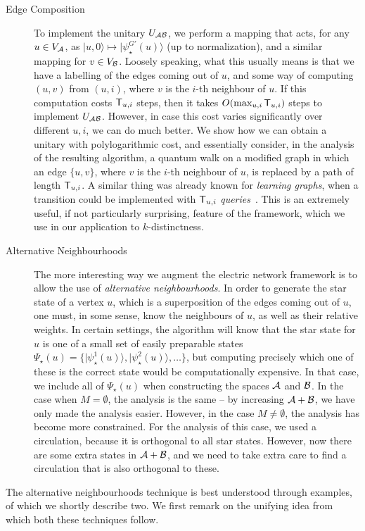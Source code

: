 \documentclass{theoretics}
\def\ket#1{{\lvert}#1\rangle}
\renewcommand{\>}{\rangle}
\newcommand{\<}{\langle}
\renewcommand{\(}{\left(}
\renewcommand{\)}{\right)}
\begin{document}
\begin{description}
\item[Edge Composition] To implement the unitary $U_{\cal AB}$, we perform a mapping that acts, for any $u\in V_{\cal A}$, as $\ket{u,0}\mapsto \ket{\psi_\star^{G'}(u)}$ (up to normalization), and a similar mapping for $v\in V_{\cal B}$. Loosely speaking, what this usually means is that we have a labelling of the edges coming out of $u$, and some way of computing $(u,v)$ from $(u,i)$, where $v$ is the $i$-th neighbour of $u$. If this computation costs ${\sf T}_{u,i}$ steps, then it takes $O(\max_{u,i}{\sf T}_{u,i})$ steps to implement $U_{\cal AB}$. However, in case this cost varies significantly over different $u,i$, we can do much better. We show how we can obtain a unitary with polylogarithmic cost, and essentially consider, in the analysis of the resulting algorithm, a quantum walk on a modified graph in which an edge $\{u,v\}$, where $v$ is the $i$-th neighbour of $u$, is replaced by a path of length ${\sf T}_{u,i}$.  A similar thing was already known for \emph{learning graphs}, when a transition could be implemented with ${\sf T}_{u,i}$ \emph{queries}~\cite{belovs2012LG}. This is an extremely useful, if not particularly surprising, feature of the framework, which we use in our application to $k$-distinctness. 
\item[Alternative Neighbourhoods] The more interesting way we augment the electric network framework is to allow the use of \emph{alternative neighbourhoods}. In order to generate the star state of a vertex $u$, which is a superposition of the edges coming out of $u$, one must, in some sense, know the neighbours of $u$, as well as their relative weights. In certain settings, the algorithm will know that the star state for $u$ is one of a small set of easily preparable states $\Psi_\star(u)=\{\ket{\psi_\star^1(u)},\ket{\psi^2_\star(u)},\dots\}$, but computing precisely which one of these is the correct state would be computationally expensive. In that case, we include all of $\Psi_\star(u)$ when constructing the spaces ${\cal A}$ and ${\cal B}$. In the case when $M=\emptyset$, the analysis is the same -- by increasing ${\cal A}+{\cal B}$, we have only made the analysis easier. However, in the case $M\neq \emptyset$, the analysis has become more constrained. For the analysis of this case, we used a circulation, because it is orthogonal to all star states. However, now there are some extra states in ${\cal A}+{\cal B}$, and we need to take extra care to find a circulation that is also orthogonal to these. 
\end{description}
The alternative neighbourhoods technique is best understood through examples, of which we shortly describe two. We first remark on the unifying idea from which both these techniques follow. 
\end{document}
